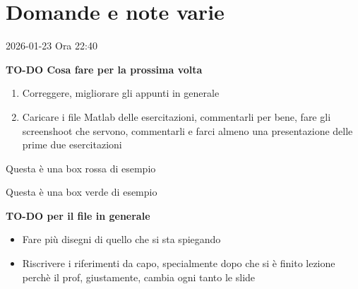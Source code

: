 \section*{Domande e note varie}

2026-01-23 Ora 22:40\newline 

\textbf{TO-DO Cosa fare per la prossima volta} 

\begin{enumerate}
    \item Correggere, migliorare gli appunti in generale  
    \item Caricare i file Matlab delle esercitazioni, commentarli per bene, fare gli screenshoot che servono, commentarli e farci almeno una presentazione delle prime due esercitazioni 
\end{enumerate}

\begin{tcolorbox}[colback=red!5!white,colframe=red!75!black]
Questa è una box rossa di esempio
\end{tcolorbox}

\begin{tcolorbox}[colback=green!5!white,colframe=green!75!black]
Questa è una box verde di esempio
\end{tcolorbox} 

\textbf{TO-DO per il file in generale}

\begin{itemize}
    \item Fare più disegni di quello che si sta spiegando 
    \item Riscrivere i riferimenti da capo, specialmente dopo che si è finito lezione perchè il prof, giustamente, cambia ogni tanto le slide
\end{itemize}

 
\newpage 